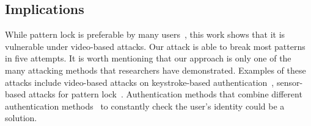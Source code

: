 
\vspace{-3mm}
\subsection{Implications}
While pattern lock is preferable by many users~\cite{androidstudy}, this     work shows
that it is vulnerable under video-based attacks. Our attack
is able to break most patterns in five attempts. 
It is worth mentioning that our approach is only one of the many attacking
methods that researchers have demonstrated. Examples of these attacks include
video-based attacks on keystroke-based authentication~\cite{shukla2014beware,yue2014blind}, sensor-based attacks for
pattern lock~\cite{zhang2016privacy}. Authentication methods that combine different
authentication methods~\cite{de2012touch,stefan2012robustness,lingsecure,mannan2007using} to constantly check the user's identity could be
a solution. %




